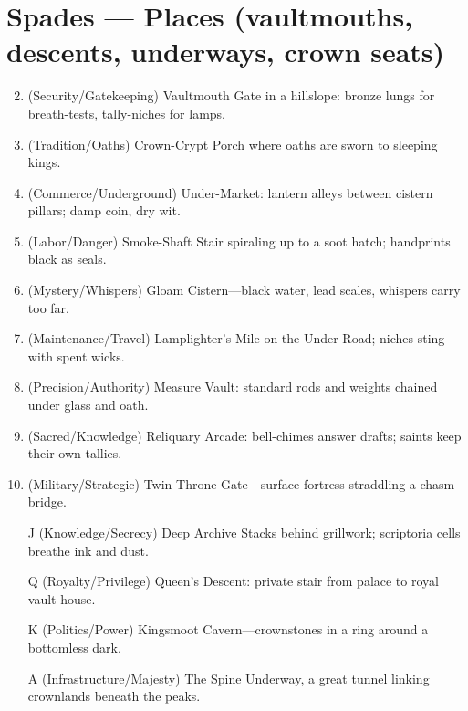 \section*{Spades --- Places (vaultmouths, descents, underways, crown seats)}
\label{sec:aeler-places}
\begin{enumerate}
\setcounter{enumi}{1}
\item (Security/Gatekeeping) Vaultmouth Gate in a hillslope: bronze lungs for breath-tests, tally-niches for lamps.
\item (Tradition/Oaths) Crown-Crypt Porch where oaths are sworn to sleeping kings.
\item (Commerce/Underground) Under-Market: lantern alleys between cistern pillars; damp coin, dry wit.
\item (Labor/Danger) Smoke-Shaft Stair spiraling up to a soot hatch; handprints black as seals.
\item (Mystery/Whispers) Gloam Cistern---black water, lead scales, whispers carry too far.
\item (Maintenance/Travel) Lamplighter's Mile on the Under-Road; niches sting with spent wicks.
\item (Precision/Authority) Measure Vault: standard rods and weights chained under glass and oath.
\item (Sacred/Knowledge) Reliquary Arcade: bell-chimes answer drafts; saints keep their own tallies.
\item (Military/Strategic) Twin-Throne Gate---surface fortress straddling a chasm bridge.
\item[J] (Knowledge/Secrecy) Deep Archive Stacks behind grillwork; scriptoria cells breathe ink and dust.
\item[Q] (Royalty/Privilege) Queen's Descent: private stair from palace to royal vault-house.
\item[K] (Politics/Power) Kingsmoot Cavern---crownstones in a ring around a bottomless dark.
\item[A] (Infrastructure/Majesty) The Spine Underway, a great tunnel linking crownlands beneath the peaks.
\end{enumerate}

